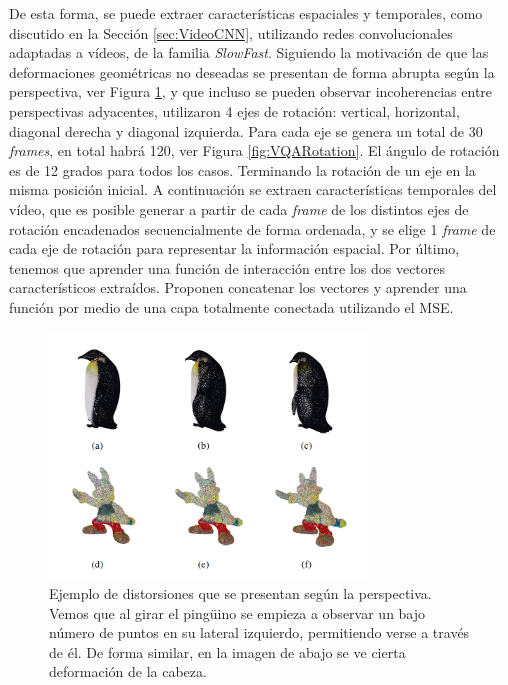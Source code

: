 De esta forma, se puede extraer características espaciales y temporales, como 
discutido en la Sección \ref{sec:VideoCNN}, utilizando redes convolucionales 
adaptadas a vídeos, de la familia \emph{SlowFast}\cite{SlowFastNetworks}.
Siguiendo la motivación de que las deformaciones geométricas no deseadas se presentan 
de forma abrupta según la perspectiva, ver Figura \ref{fig:ViewPoint}, y que 
incluso se pueden observar incoherencias entre perspectivas adyacentes, 
utilizaron 4 ejes de rotación: vertical, horizontal, diagonal derecha 
y diagonal izquierda. Para cada eje se genera un total de 30 \emph{frames}, 
en total habrá 120, ver Figura \ref{fig:VQARotation}. El ángulo de rotación es de 12 grados para todos los casos. 
Terminando la rotación de un eje en la misma posición inicial. 
A continuación se extraen características temporales del vídeo, que es posible 
generar a partir de cada \emph{frame} de los distintos ejes de rotación encadenados
secuencialmente de forma ordenada, y se elige 1 \emph{frame} de cada 
eje de rotación para representar la información espacial. Por último, 
tenemos que aprender una función de interacción entre los dos vectores característicos 
extraídos. Proponen concatenar los vectores y aprender una función por 
medio de una capa totalmente conectada utilizando el MSE.

\begin{figure}
  \begin{center}
    \includegraphics[width=0.75\textwidth]{imagenes/chapter4/ViewPoint}
  \end{center}
  \caption[Ejemplo de distorsiones que se presentan según la perspectiva]{
  Ejemplo de distorsiones que se presentan según la perspectiva.
Vemos que al girar el pingüino se empieza a observar un bajo número de puntos en su 
lateral izquierdo, permitiendo verse a través de él. De forma similar, 
en la imagen de abajo se ve cierta deformación de la cabeza.}
  \label{fig:ViewPoint}
\end{figure}

